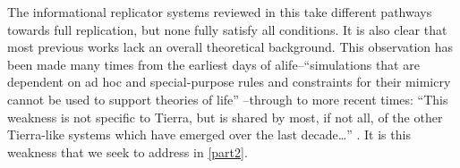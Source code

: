 The informational replicator systems reviewed in this  take different pathways towards full replication, but none fully satisfy all conditions. It is also clear that most previous works lack an overall theoretical background. This observation has been made many times from the earliest days of \gls{alife}--``simulations that are dependent on ad hoc and special-purpose rules and constraints for their mimicry cannot be used to support theories of life'' \parencite{Pattee1988}--through to more recent times: ``This weakness is not specific to Tierra, but is shared by most, if not all, of the other Tierra-like systems which have emerged over the last decade\ldots{}'' \parencite{Taylor2001}. It is this weakness that we seek to address in \cref{part2}.

%


